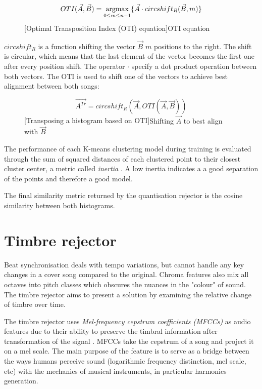 \begin{figure}[H]
   \begin{equation}
       OTI(\vec{A}, \vec{B}) = \operatorname*{argmax}_{0 \leq m \leq {n-1}}\{\vec{A} \cdot circshift_{R}(\vec{B}, m)\}
   \end{equation}
   [Optimal Transposition Index (OTI) equation]{OTI equation}
\end{figure}

$circshift_R$ is a function shifting the vector $\vec{B}$ $m$ positions to the
right. The shift is circular, which means that the last element of the vector
becomes the first one after every position shift. The operator $\cdot$ specify a
dot product operation between both vectors. The OTI is used to shift one of the
vectors to achieve best alignment between both songs:
\begin{figure}[H]
\begin{equation}
    \vec{A^{Tr}} = circshift_R(\vec{A}, OTI(\vec{A}, \vec{B})) 
\end{equation}
[Transposing a histogram based on OTI]{Shifting $\vec{A}$ to best align with $\vec{B}$}
\end{figure}

The performance of each K-means clustering model during training is evaluated
through the sum of squared distances of each clustered point to their closest
cluster center, a metric called \textit{inertia} \cite{scikit-learn}. A low
inertia indicates a a good separation of the points and therefore a good model.

The final similarity metric returned
by the quantisation rejector is the cosine similarity between both histograms.

\section{Timbre rejector} 
\label{sec:timbre}
Beat synchronisation deals with tempo variations, but cannot handle any key
changes in a cover song compared to the original. Chroma features also mix all
octaves into pitch classes which obscures the nuances in the "colour" of sound.
The timbre rejector aims to present a solution by examining the relative change
of timbre over time.

The timbre rejector uses \textit{Mel-frequency cepstrum coefficients (MFCCs)} as
audio features due to their ability to preserve the timbral information after
transformation of the signal \cite{tralie2015cover}. MFCCs take the cepstrum of
a song and project it on a mel scale. The main purpose of the feature is to
serve as a bridge between the ways humans perceive sound (logarithmic frequency
distinction, mel scale, etc) with the mechanics of musical instruments, in
particular harmonics generation.

